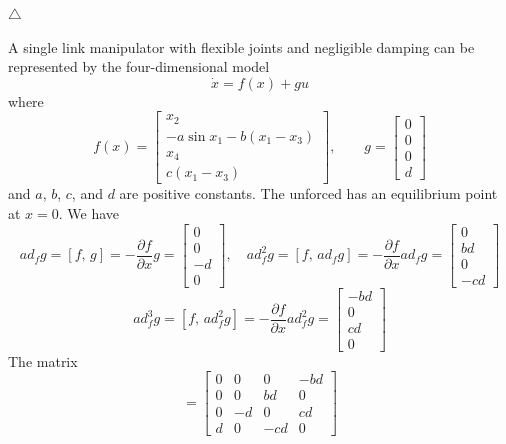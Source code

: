 \documentclass[12pt,a4paper,oneside]{book}
\begin{document}
\begin{onehalfspace}
\begin{example}
			\hfill$\triangle$
\end{example}
\begin{example}
	A single link manipulator with flexible joints and negligible damping can be represented by the four-dimensional model
	\begin{equation*}
		\dot{x}=f(x)+gu
	\end{equation*}
	where 
	\begin{equation*}
		f(x)=\begin{bmatrix} x_2 \\[6pt] -a\sin x_1-b(x_1-x_3) \\[6pt] x_4 \\[6pt] c(x_1-x_3)
		\end{bmatrix}, \qquad 
			g=\begin{bmatrix} 0 \\[6pt] 0 \\[6pt] 0 \\[6pt] d
		\end{bmatrix}
	\end{equation*}
	and $a$, $b$, $c$, and $d$ are positive constants. The unforced has an equilibrium point at $x=0$. We have
	\begin{equation*}
		ad_fg=[f,\,g]=-\frac{\partial f}{\partial x}g=\begin{bmatrix} 0 \\[6pt] 0 \\[6pt] -d \\[6pt] 0 \end{bmatrix}, \quad
		ad_f^2g=[f,\,ad_fg]=-\frac{\partial f}{\partial x}ad_fg=\begin{bmatrix} 0 \\[6pt] bd \\[6pt] 0 \\[6pt] -cd \end{bmatrix}
	\end{equation*}
	\begin{equation*}
		ad_f^3g=[f,\,ad_f^2g]=-\frac{\partial f}{\partial x}ad_f^2g=\begin{bmatrix} -bd \\[6pt] 0 \\[6pt] cd \\[6pt] 0 \end{bmatrix}
	\end{equation*}
	The matrix
	\begin{equation*}
		[g,\,ad_fg,\,ad_f^2g,\,ad_f^3g] = \begin{bmatrix} 0&0&0&-bd \\[6pt] 0&0&bd&0 \\[6pt] 0&-d&0&cd \\[6pt] d&0&-cd&0 \end{bmatrix}

\end{equation*}
\end{example}
\end{onehalfspace}
\end{document}
